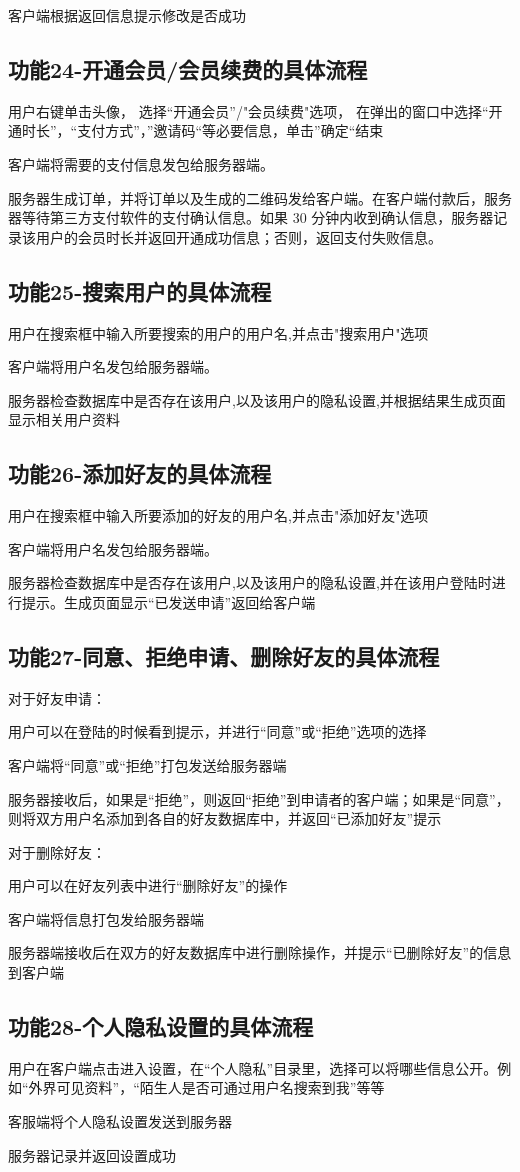 客户端根据返回信息提示修改是否成功
{
\color{red}
\subsection{功能24-开通会员/会员续费的具体流程}
用户右键单击头像， 选择“开通会员”/"会员续费"选项， 在弹出的窗口中选择“开通时长”，“支付方式”，”邀请码“等必要信息，单击”确定“结束

客户端将需要的支付信息发包给服务器端。

服务器生成订单，并将订单以及生成的二维码发给客户端。在客户端付款后，服务器等待第三方支付软件的支付确认信息。如果 30 分钟内收到确认信息，服务器记录该用户的会员时长并返回开通成功信息；否则，返回支付失败信息。

\subsection{功能25-搜索用户的具体流程}
用户在搜索框中输入所要搜索的用户的用户名,并点击"搜索用户"选项

客户端将用户名发包给服务器端。

服务器检查数据库中是否存在该用户,以及该用户的隐私设置,并根据结果生成页面显示相关用户资料

\subsection{功能26-添加好友的具体流程}
用户在搜索框中输入所要添加的好友的用户名,并点击"添加好友"选项

客户端将用户名发包给服务器端。

服务器检查数据库中是否存在该用户,以及该用户的隐私设置,并在该用户登陆时进行提示。生成页面显示“已发送申请”返回给客户端

\subsection{功能27-同意、拒绝申请、删除好友的具体流程}
对于好友申请：

用户可以在登陆的时候看到提示，并进行“同意”或“拒绝”选项的选择

客户端将“同意”或“拒绝”打包发送给服务器端

服务器接收后，如果是“拒绝”，则返回“拒绝”到申请者的客户端；如果是“同意”，则将双方用户名添加到各自的好友数据库中，并返回“已添加好友”提示

对于删除好友：

用户可以在好友列表中进行“删除好友”的操作

客户端将信息打包发给服务器端

服务器端接收后在双方的好友数据库中进行删除操作，并提示“已删除好友”的信息到客户端

\subsection{功能28-个人隐私设置的具体流程}
用户在客户端点击进入设置，在“个人隐私”目录里，选择可以将哪些信息公开。例如“外界可见资料”，“陌生人是否可通过用户名搜索到我”等等

客服端将个人隐私设置发送到服务器

服务器记录并返回设置成功
}


